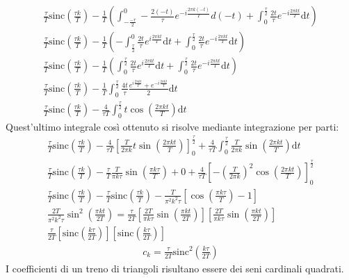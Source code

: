 \documentclass{article}
\newcommand{\sinc}{\mbox{sinc}}
\newcommand{\df}{\mathrm{d}}
\begin{document}
\begin{gather*}
    \displaystyle\frac{\tau}{T}\sinc\left(\frac{\tau k}{T}\right)-\frac{1}{T}\left(\int_{-\frac{-\tau}{2}}^{0}-\frac{2(-t)}{\tau}e^{-i\frac{2\pi k(-t)}{T}}d(-t)+\int_{0}^{\frac{\tau}{2}}\frac{2t}{\tau}e^{-i\frac{2\pi kt}{T}}\df t\right)\\
    \displaystyle\frac{\tau}{T}\sinc\left(\frac{\tau k}{T}\right)-\frac{1}{T}\left(-\int_{\frac{\tau}{2}}^{0}\frac{2t}{\tau}e^{i\frac{2\pi kt}{T}}\df t+\int_{0}^{\frac{\tau}{2}}\frac{2t}{\tau}e^{-i\frac{2\pi kt}{T}}\df t\right)\\
    \displaystyle\frac{\tau}{T}\sinc\left(\frac{\tau k}{T}\right)-\frac{1}{T}\left(\int^{\frac{\tau}{2}}_{0}\frac{2t}{\tau}e^{i\frac{2\pi kt}{T}}\df t+\int_{0}^{\frac{\tau}{2}}\frac{2t}{\tau}e^{-i\frac{2\pi kt}{T}}\df t\right)\\
    \displaystyle\frac{\tau}{T}\sinc\left(\frac{\tau k}{T}\right)-\frac{1}{T}\int^{\frac{\tau}{2}}_{0}\frac{4t}{\tau}\frac{e^{i\frac{2\pi kt}{T}}+e^{-i\frac{2\pi kt}{T}}}{2}\df t\\
    \displaystyle\frac{\tau}{T}\sinc\left(\frac{\tau k}{T}\right)-\frac{4}{\tau T}\int_{0}^{\frac{\tau}{2}}t\cos\left(\frac{2\pi kt}{T}\right)\df t
\end{gather*}
Quest'ultimo integrale così ottenuto si risolve mediante integrazione per parti:
\begin{gather*}
    \displaystyle\frac{\tau}{T}\sinc\left(\frac{\tau k}{T}\right)-\frac{4}{\tau T}\left[\frac{T}{2\pi k}t\sin\left(\frac{2\pi kt}{T}\right)\right]^{\frac{\tau}{2}}_0
    +\frac{4}{\tau T}\int_{0}^{\frac{\tau}{2}}\frac{T}{2\pi k}\sin\left(\frac{2\pi kt}{T}\right)\df t\\
    \displaystyle\frac{\tau}{T}\sinc\left(\frac{\tau k}{T}\right)-\frac{\tau}{T}\frac{T}{\pi k\tau}\sin\left(\frac{\pi k\tau}{T}\right)+0+
    \frac{4}{\tau T}\left[-\left(\frac{T}{2\pi k}\right)^2\cos\left(\frac{2\pi kt}{T}\right)\right]^{\frac{\tau}{2}}_0\\
    \displaystyle\frac{\tau}{T}\sinc\left(\frac{\tau k}{T}\right)-\displaystyle\frac{\tau}{T}\sinc\left(\frac{\tau k}{T}\right)-
    \frac{T}{\pi^2k^2\tau}\left[\cos\left(\frac{\pi k\tau}{T}\right)-1\right]\\
    \displaystyle\frac{2T}{\pi^2k^2\tau}\sin^2\left(\frac{\pi kt}{2T}\right)=
    \frac{\tau}{2T}\left[\frac{2T}{\pi k\tau}\sin\left(\frac{\pi kt}{2T}\right)\right]\left[\frac{2T}{\pi k\tau}\sin\left(\frac{\pi kt}{2T}\right)\right]\\
    \displaystyle\frac{\tau}{2T}\left[\sinc\left(\frac{k\tau}{2T}\right)\right]\left[\sinc\left(\frac{k\tau}{2T}\right)\right]
\end{gather*}
\begin{gather}
    c_k=\displaystyle\frac{\tau}{2T}\sinc^2\left(\frac{k\tau }{2T}\right)
\end{gather}
I coefficienti di un treno di triangoli risultano essere dei seni cardinali quadrati. 
\end{document}
